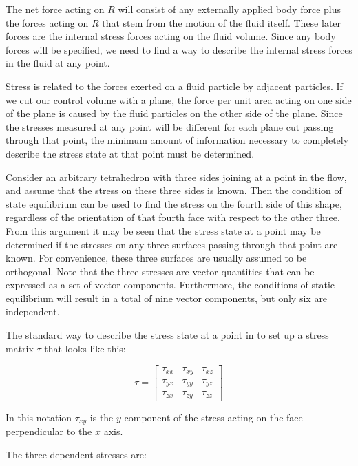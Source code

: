 The net force acting on $R$ will consist of any externally applied body force
plus the forces acting on $R$ that stem from the motion of the fluid itself.
These later forces are the internal stress forces acting on the fluid volume.
Since any body forces will be specified, we need to find a way to describe the
internal stress forces in the fluid at any point.  

Stress is related to the forces exerted on a fluid particle by adjacent
particles. If we cut our control volume with a plane, the force per unit area
acting on one side of the plane is caused by the fluid particles on the other
side of the plane. Since  the stresses measured at any point will be different
for each plane cut passing through that point, the minimum amount of
information necessary to completely describe the stress state at that point
must be determined.

Consider an arbitrary tetrahedron with three sides joining at a point in the
flow, and assume that the stress on these three sides is known. Then the
condition of state equilibrium can be used to find the stress on the fourth
side of this shape, regardless of the orientation of that fourth face with
respect to the other three. From this argument it may be seen that the stress
state at a point may be determined if the stresses on any three surfaces
passing through that point are known. For convenience, these three surfaces are
usually assumed to be orthogonal. Note that the three stresses are vector
quantities that can be expressed as a set of vector components. Furthermore,
the conditions of static equilibrium will result in a total of nine vector
components, but only six are independent.

The standard way to describe the stress state at a point in to set up a stress
matrix $\tau$ that looks like this:

\begin{equation}
\tau = \begin{bmatrix}
\tau_{xx} & \tau_{xy} & \tau_{xz}\\
\tau_{yx} & \tau_{yy} & \tau_{yz} \\
\tau_{zx} & \tau_{zy} & \tau_{zz}
\end{bmatrix}
\end{equation}

In this notation $\tau_{xy}$ is the $y$ component of the stress acting on the
face perpendicular to the $x$ axis.

The three dependent stresses are:

